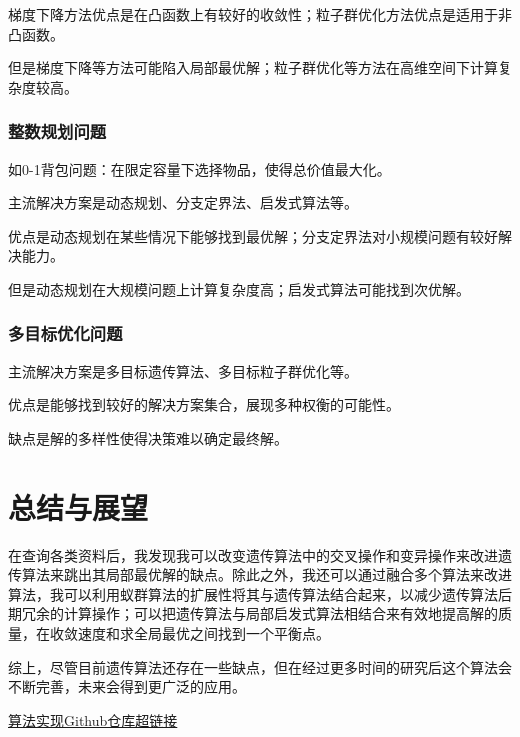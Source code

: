 \documentclass{cjc}
\begin{document}
梯度下降方法优点是在凸函数上有较好的收敛性；粒子群优化方法优点是适用于非凸函数。

但是梯度下降等方法可能陷入局部最优解；粒子群优化等方法在高维空间下计算复杂度较高。
\subsubsection{整数规划问题}
如0-1背包问题：在限定容量下选择物品，使得总价值最大化。

主流解决方案是动态规划、分支定界法、启发式算法等。

优点是动态规划在某些情况下能够找到最优解；分支定界法对小规模问题有较好解决能力。

但是动态规划在大规模问题上计算复杂度高；启发式算法可能找到次优解。

\subsubsection{多目标优化问题}
主流解决方案是多目标遗传算法、多目标粒子群优化等。

优点是能够找到较好的解决方案集合，展现多种权衡的可能性。

缺点是解的多样性使得决策难以确定最终解。
\section{总结与展望}
在查询各类资料后，我发现我可以改变遗传算法中的交叉操作和变异操作来改进遗传算法来跳出其局部最优解的缺点。除此之外，我还可以通过融合多个算法来改进算法，我可以利用蚁群算法的扩展性将其与遗传算法结合起来，以减少遗传算法后期冗余的计算操作；可以把遗传算法与局部启发式算法相结合来有效地提高解的质量，在收敛速度和求全局最优之间找到一个平衡点。

综上，尽管目前遗传算法还存在一些缺点，但在经过更多时间的研究后这个算法会不断完善，未来会得到更广泛的应用。

\nocite{*}



\href{https://github.com/fordiker/code.git}{算法实现Github仓库超链接}
\end{document}
